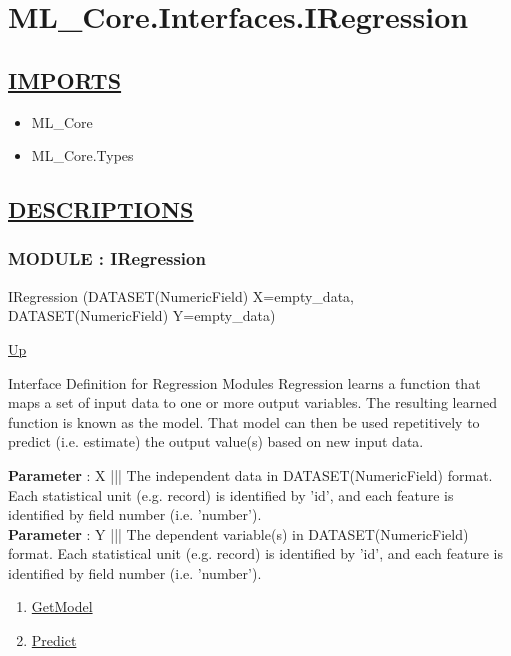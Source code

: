 \chapter*{ML\_Core.Interfaces.IRegression}
\hypertarget{ecldoc:toc:ML_Core.Interfaces.IRegression}{}

\section*{\underline{IMPORTS}}
\begin{itemize}
\item ML\_Core
\item ML\_Core.Types
\end{itemize}

\section*{\underline{DESCRIPTIONS}}
\subsection*{MODULE : IRegression}
\hypertarget{ecldoc:ml_core.interfaces.iregression}{}
\begin{minipage}[t]{\textwidth}
\begin{flushleft}
 IRegression (DATASET(NumericField) X=empty\_data, DATASET(NumericField) Y=empty\_data)
\end{flushleft}
\end{minipage}
\hyperlink{ecldoc:toc:ML_Core/Interfaces}{Up}

\par
Interface Definition for Regression Modules Regression learns a function that maps a set of input data to one or more output variables. The resulting learned function is known as the model. That model can then be used repetitively to predict (i.e. estimate) the output value(s) based on new input data.
\par
\textbf{Parameter} : X ||| The independent data in DATASET(NumericField) format. Each statistical unit (e.g. record) is identified by 'id', and each feature is identified by field number (i.e. 'number'). \\
\textbf{Parameter} : Y ||| The dependent variable(s) in DATASET(NumericField) format. Each statistical unit (e.g. record) is identified by 'id', and each feature is identified by field number (i.e. 'number'). \\
\begin{enumerate}
\item \hyperlink{ecldoc:ml_core.interfaces.iregression.getmodel}{GetModel}
\item \hyperlink{ecldoc:ml_core.interfaces.iregression.predict}{Predict}
\end{enumerate}
